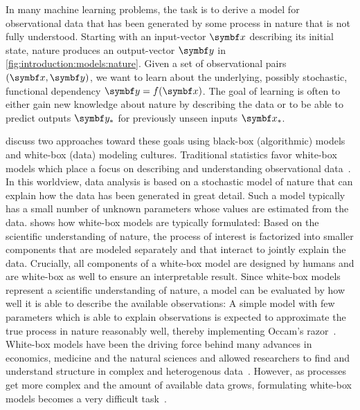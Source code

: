 In many machine learning problems, the task is to derive a model for observational data that has been generated by some process in nature that is not fully understood.
Starting with an input-vector $\mat{x}$ describing its initial state, nature produces an output-vector $\mat{y}$ in \cref{fig:introduction:models:nature}.
Given a set of observational pairs $(\mat{x}, \mat{y})$, we want to learn about the underlying, possibly stochastic, functional dependency $\mat{y} = f(\mat{x})$.
The goal of learning is often to either gain new knowledge about nature by describing the data or to be able to predict outputs $\mat{y}_\ast$ for previously unseen inputs $\mat{x}_\ast$.

\Textcite{breiman_statistical_2001,shmueli_explain_2010} discuss two approaches toward these goals using black-box (algorithmic) models and white-box (data) modeling cultures.
Traditional statistics favor white-box models which place a focus on describing and understanding observational data~\parencite{andrew_gelman_bayesian_2013,casella_statistical_2002,cox_planning_1958}.
In this worldview, data analysis is based on a stochastic model of nature that can explain how the data has been generated in great detail.
Such a model typically has a small number of unknown parameters whose values are estimated from the data.
 shows how white-box models are typically formulated:
Based on the scientific understanding of nature, the process of interest is factorized into smaller components that are modeled separately and that interact to jointly explain the data.
Crucially, all components of a white-box model are designed by humans and are white-box as well to ensure an interpretable result.
Since white-box models represent a scientific understanding of nature, a model can be evaluated by how well it is able to describe the available observations:
A simple model with few parameters which is able to explain observations is expected to approximate the true process in nature reasonably well, thereby implementing Occam's razor~\parencite{thorburn_occams_1915}.
White-box models have been the driving force behind many advances in economics, medicine and the natural sciences and allowed researchers to find and understand structure in complex and heterogenous data~\parencite{efron_modern_2005,giulio_d._agostini_bayesian_2003}.
However, as processes get more complex and the amount of available data grows, formulating white-box models becomes a very difficult task~\parencite{sutton_bitter_2019}.

